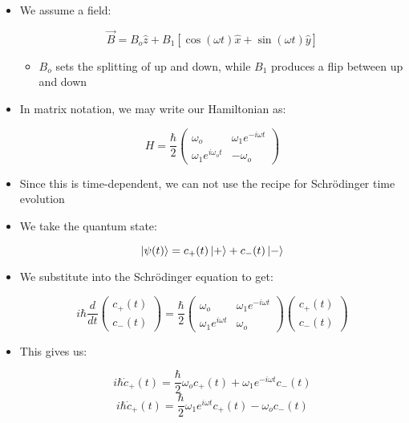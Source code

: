 \begin{itemize}
\begin{itemize}
      \item We assume a field:

        $$\vec{B}=B_o\hat{z}+B_1[\cos(\omega t)\hat{x}+\sin(\omega t)\hat{y}]$$

        \begin{itemize}

          \item $B_o$ sets the splitting of up and down, while $B_1$ produces a flip between up and down

        \end{itemize}

      \item In matrix notation, we may write our Hamiltonian as:

        $$H=\frac{\hbar}{2}\left( \begin{matrix} \omega_o & \omega_1e^{-i\omega t}\\ \omega_1e^{i\omega_o t} & -\omega_o \end{matrix}\right)$$

        \item Since this is time-dependent, we can not use the recipe for Schr\"odinger time evolution

        \item We take the quantum state:

          $$\ket{\psi(t)}=c_+(t)\ket{+}+c_-(t)\ket{-}$$

        \item We substitute into the Schr\"odinger equation to get:

          $$i\hbar\frac{d}{dt}\left( \begin{matrix} c_+(t)\\c_-(t)\end{matrix} \right)=\frac{\hbar}{2}\left( \begin{matrix} \omega_o & \omega_1e^{-i\omega t}\\ \omega_1e^{i\omega t} & \omega_o\end{matrix} \right)\left( \begin{matrix} c_+(t)\\ c_-(t)\end{matrix} \right)$$

        \item This gives us:

          $$i\hbar \dot{c}_+(t)=\frac{\hbar}{2}\omega_oc_+(t)+\omega_1e^{-i\omega t}c_-(t)$$
          $$i\hbar \dot{c}_+(t)=\frac{\hbar}{2}\omega_1e^{i\omega t}c_+(t)-\omega_oc_-(t)$$


\end{itemize}
\end{itemize}
